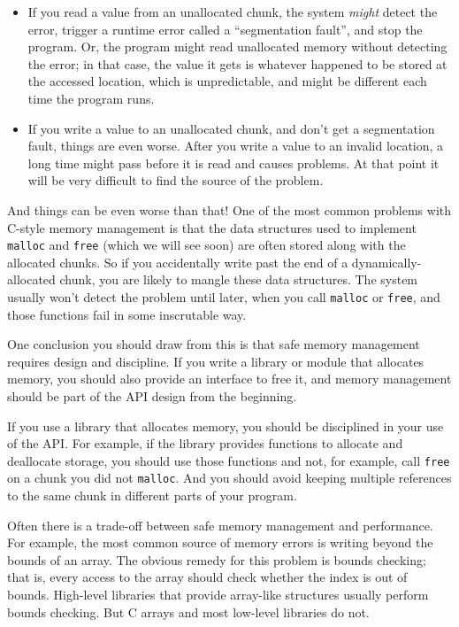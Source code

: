 \documentclass[12pt]{book}
\begin{document}
{\begin{itemize}

\item If you read a value from an unallocated chunk, the system {\em might} detect the error, trigger a runtime error called a ``segmentation fault'', and stop the program.  Or, the program might read unallocated memory without detecting the error; in that case, the value it gets is whatever happened to be stored at the accessed location, which is unpredictable, and might be different each time the program runs.

\item If you write a value to an unallocated chunk, and don't get a segmentation fault, things are even worse.  After you write a value to an invalid location, a long time might pass before it is read and causes problems.  At that point it will be very difficult to find the source of the problem.

\end{itemize} 

And things can be even worse than that!  One of the most common
problems with C-style memory management is that the data structures
used to implement {\tt malloc} and {\tt free} (which we will see soon)
are often stored along with the allocated chunks.  So if you
accidentally write past the end of a dynamically-allocated chunk, you
are likely to mangle these data structures.  The system usually won't
detect the problem until later, when you call {\tt malloc} or
{\tt free}, and those functions fail in some inscrutable way.

One conclusion you should draw from this is that safe memory
management requires design and discipline.  If you write a library
or module that allocates memory, you should also provide an
interface to free it, and memory management should be part of
the API design from the beginning.

If you use a library that allocates memory, you should be disciplined
in your use of the API.  For example, if the library provides
functions to allocate and deallocate storage, you should use those
functions and not, for example, call {\tt free} on a chunk you did not
{\tt malloc}.  And you should avoid keeping multiple references to the
same chunk in different parts of your program.

Often there is a trade-off between safe memory management and performance.
For example, the most common source of memory errors is writing 
beyond the bounds of an array.  The obvious remedy for this problem
is bounds checking; that is, every access to the array should check
whether the index is out of bounds.  High-level libraries that provide
array-like structures usually perform bounds checking.  But C arrays
and most low-level libraries do not.


}
\end{document}
